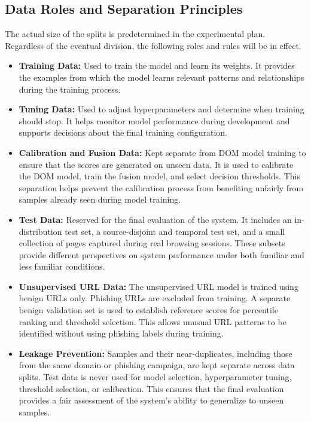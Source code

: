\documentclass{FastFyp}
\begin{document}
\subsection{Data Roles and Separation Principles}
\label{sec:roles}

The actual size of the splits is predetermined in the experimental plan. Regardless of the eventual division, the following roles and rules will be in effect.

\begin{itemize}
    \item \textbf{Training Data:} Used to train the model and learn its weights. It provides the examples from which the model learns relevant patterns and relationships during the training process.

    \item \textbf{Tuning Data:} Used to adjust hyperparameters and determine when training should stop. It helps monitor model performance during development and supports decisions about the final training configuration.

    \item \textbf{Calibration and Fusion Data:} Kept separate from DOM model training to ensure that the scores are generated on unseen data. It is used to calibrate the DOM model, train the fusion model, and select decision thresholds. This separation helps prevent the calibration process from benefiting unfairly from samples already seen during model training.

    \item \textbf{Test Data:} Reserved for the final evaluation of the system. It includes an in-distribution test set, a source-disjoint and temporal test set, and a small collection of pages captured during real browsing sessions. These subsets provide different perspectives on system performance under both familiar and less familiar conditions.

    \item \textbf{Unsupervised URL Data:} The unsupervised URL model is trained using benign URLs only. Phishing URLs are excluded from training. A separate benign validation set is used to establish reference scores for percentile ranking and threshold selection. This allows unusual URL patterns to be identified without using phishing labels during training.

    \item \textbf{Leakage Prevention:} Samples and their near-duplicates, including those from the same domain or phishing campaign, are kept separate across data splits. Test data is never used for model selection, hyperparameter tuning, threshold selection, or calibration. This ensures that the final evaluation provides a fair assessment of the system's ability to generalize to unseen samples.
\end{itemize}
\end{document}
